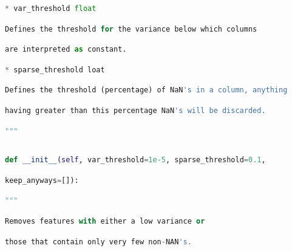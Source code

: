 \documentclass[
  11pt,
  a4paper,
  DIV=12,captions=tableheading,oneside]{scrbook}
\begin{document}
\begin{lstlisting}[language=Python,stepnumber=2,basicstyle=\footnotesize]
    * var_threshold float\end{lstlisting}
\begin{lstlisting}[language=Python,stepnumber=2,basicstyle=\footnotesize]
        Defines the threshold for the variance below which columns\end{lstlisting}
\begin{lstlisting}[language=Python,stepnumber=2,basicstyle=\footnotesize]
        are interpreted as constant.\end{lstlisting}
\begin{lstlisting}[language=Python,stepnumber=2,basicstyle=\footnotesize]
    * sparse_threshold loat\end{lstlisting}
\begin{lstlisting}[language=Python,stepnumber=2,basicstyle=\footnotesize]
        Defines the threshold (percentage) of NaN's in a column, anything\end{lstlisting}
\begin{lstlisting}[language=Python,stepnumber=2,basicstyle=\footnotesize]
        having greater than this percentage NaN's will be discarded.\end{lstlisting}
\begin{lstlisting}[language=Python,stepnumber=2,basicstyle=\footnotesize]
    """\end{lstlisting}
\begin{lstlisting}[language=Python,stepnumber=2,basicstyle=\footnotesize]
\end{lstlisting}
\begin{lstlisting}[language=Python,stepnumber=2,basicstyle=\footnotesize]
    def __init__(self, var_threshold=1e-5, sparse_threshold=0.1,\end{lstlisting}
\begin{lstlisting}[language=Python,stepnumber=2,basicstyle=\footnotesize]
                 keep_anyways=[]):\end{lstlisting}
\begin{lstlisting}[language=Python,stepnumber=2,basicstyle=\footnotesize]
        """\end{lstlisting}
\begin{lstlisting}[language=Python,stepnumber=2,basicstyle=\footnotesize]
        Removes features with either a low variance or\end{lstlisting}
\begin{lstlisting}[language=Python,stepnumber=2,basicstyle=\footnotesize]
        those that contain only very few non-NAN's.\end{lstlisting}
\end{document}
